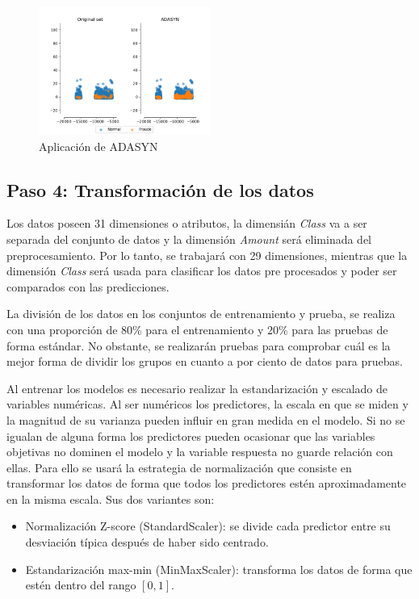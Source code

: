   \begin{figure}[h!]
  	\centering
  	\includegraphics[width=0.5\textwidth]{"figuras/Fig12"}
  	\caption{Aplicaci\'{o}n de ADASYN}
  \end{figure}

\subsection{Paso 4: Transformaci\'{o}n de los datos}

  Los datos poseen 31 dimensiones o atributos, la dimensi\'{a}n \textit{Class} va a ser separada del conjunto de datos y la dimensi\'{o}n \textit{Amount} ser\'{a} eliminada del preprocesamiento. Por lo tanto, se trabajar\'{a} con 29 dimensiones, mientras que la dimensi\'{o}n \textit{Class} ser\'{a} usada para clasificar los datos pre procesados y poder ser comparados con las predicciones.
  
  La divisi\'{o}n de los datos en los conjuntos de entrenamiento y prueba, se realiza con una proporci\'{o}n de 80\% para el entrenamiento y 20\% para las pruebas de forma est\'{a}ndar. No obstante, se realizar\'{a}n pruebas para comprobar cu\'{a}l es la mejor forma de dividir los grupos en cuanto a por ciento de datos para pruebas.
  
  Al entrenar los modelos es necesario realizar la estandarizaci\'{o}n y escalado de variables num\'{e}ricas. Al ser num\'{e}ricos los predictores, la escala en que se miden y la magnitud de su varianza pueden influir en gran medida en el modelo. Si no se igualan de alguna forma los predictores pueden ocasionar que las variables objetivas no dominen el modelo y la variable respuesta no guarde relaci\'{o}n con ellas. Para ello se usar\'{a} la estrategia de normalizaci\'{o}n que consiste en transformar los datos de forma que todos los predictores est\'{e}n aproximadamente en la misma escala. Sus dos variantes son:
\begin{itemize}
	\item Normalizaci\'{o}n Z-score (StandardScaler): se divide cada predictor entre su desviaci\'{o}n t\'{i}pica despu\'{e}s de haber sido centrado.
	\item Estandarizaci\'{o}n max-min (MinMaxScaler): transforma los datos de forma que est\'{e}n dentro del rango $[0,1]$.
\end{itemize}

